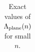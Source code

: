 \documentclass[10pt,reqno]{amsart}
\numberwithin{equation}{section}
\theoremstyle{definition}
\begin{document}
{{\begin{table}
\begin{center}
\begin{tabular}{||c c ||}
\end{tabular}
\end{center}
\caption{Exact values of $\Lambda_{\rm plane}(n)$ for small $n$.}
\label{table:exact values}
\end{table}


}}
\end{document}
